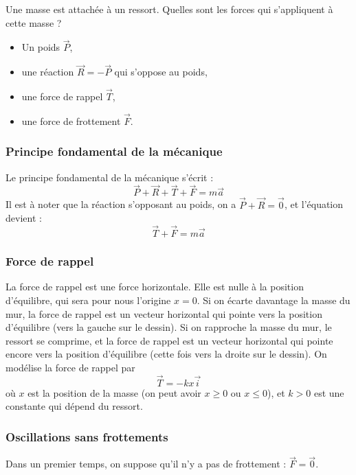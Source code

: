 \documentclass[class=report,crop=false]{standalone}
\begin{document}
Une masse est attachée à un ressort.
Quelles sont les forces qui s'appliquent à cette masse ?
\begin{itemize}
  \item Un poids $\vec P$,
  \item une réaction $\vec R=-\vec P$ qui s'oppose au poids,
  \item une force de rappel $\vec T$,
  \item une force de frottement $\vec F$.
\end{itemize}



\subsubsection*{Principe fondamental de la mécanique}

Le principe fondamental de la mécanique s'écrit :
$$\vec P + \vec R + \vec T + \vec F = m\vec a$$
Il est à noter que la réaction s'opposant au poids, on a $\vec P+\vec R = \vec 0$,
et l'équation devient :
$$\vec T + \vec F = m\vec a$$



\subsubsection*{Force de rappel}

La force de rappel est une force horizontale. Elle est nulle
à la position d'équilibre, qui sera pour nous l'origine $x=0$.
Si on écarte davantage la masse du mur,
la force de rappel est un vecteur horizontal qui pointe
vers la position d'équilibre (vers la gauche sur le dessin).
Si on rapproche la masse du mur, le ressort se comprime,
et la force de rappel est un vecteur horizontal qui pointe
encore vers la position d'équilibre (cette fois vers la droite
sur le dessin). On modélise la force de rappel par
$$\vec T = -k x \vec i$$
où $x$ est la position de la masse (on peut avoir $x\ge0$ ou $x\le 0$), et $k>0$
est une constante qui dépend du ressort.



\subsubsection*{Oscillations sans frottements}

Dans un premier temps, on suppose qu'il n'y a pas de
frottement : $\vec F = \vec 0$.
\end{document}
